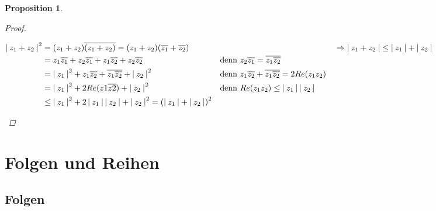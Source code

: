 \documentclass[a4paper,titlepage,oneside]{article}
\newcommand{\abs}[1]{\ensuremath{\left|\:#1\:\right|}}
\theoremstyle{thmstyle}
\newtheorem{prop}[satz]{Proposition}
\begin{document}
\begin{prop}
\begin{proof}
\begin{enumerate}[label=(\roman*)]
\begin{math}
\begin{aligned}[t]
\end{aligned}\\
\begin{aligned}[t]
\abs{z_1 + z_2}^2 &= (z_1 + z_2)\overline{(z_1 + z_2)} = (z_1 + z_2)(\overline{z_1} + \overline{z_2}) \\
&= z_1\overline{z_1} + z_2\overline{z_1} + z_1\overline{z_2} + z_2\overline{z_2} &&\text{denn } z_2\overline{z_1} = \overline{z_1\overline{z_2}} \\
&= \abs{z_1}^2 + z_1\overline{z_2} + \overline{z_1\overline{z_2}} + \abs{z_2}^2 &&\text{denn } z_1\overline{z_2} + \overline{z_1\overline{z_2}} = 2Re(z_1z_2) \\
&= \abs{z_1}^2 + 2 Re(z1 \overline{z2}) + \abs{z_2}^2 &&\text{denn } Re(z_1z_2) \le \abs{z_1}\abs{z_2}\\
&\le  \abs{z_1}^2 + 2\abs{z_1}\abs{z_2} + \abs{z_2}^2 = \left(\abs{z_1} + \abs{z_2}\right)^2
\end{aligned}\\
\Rightarrow \abs{z_1 + z_2} \le \abs{z_1} + \abs{z_2}
\end{math}  
\end{enumerate}
\end{proof}
\end{prop}

\section{Folgen und Reihen}
\subsection{Folgen}
\end{document}
